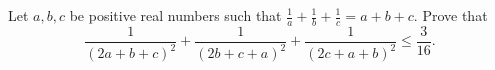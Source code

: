 Let $a, b, c$ be positive real numbers such that $\frac{1}{a} + \frac{1}{b} + \frac{1}{c} = a + b + c$. Prove that
\[
\frac{1}{(2a + b + c)^2} + \frac{1}{(2b + c + a)^2} + \frac{1}{(2c + a + b)^2} \leq \frac{3}{16}.
\]
